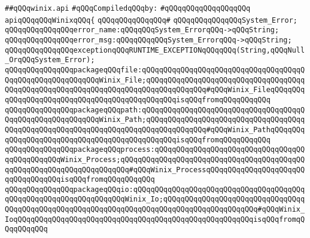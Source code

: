 \label{src/lib/src/lib/thread-kit/src/winix/winix.api}
\verb|##qQQqwinix.api|\newline
\newline
\verb|#qQQqCompiledqQQqby:|\newline
\verb|#qQQqqQQqqQQqqQQqqQQq|\newline
\newline
\newline
\newline
\verb|apiqQQqqQQqWinixqQQq{|\newline
\verb|qQQqqQQqqQQqqQQq#|\newline
\verb|qQQqqQQqqQQqqQQqSystem_Error;|\newline
\newline
\verb|qQQqqQQqqQQqqQQqerror_name:qQQqqQQqSystem_ErrorqQQq->qQQqString;|\newline
\verb|qQQqqQQqqQQqqQQqerror_msg:qQQqqQQqqQQqSystem_ErrorqQQq->qQQqString;|\newline
\newline
\verb|qQQqqQQqqQQqqQQqexceptionqQQqRUNTIME_EXCEPTIONqQQqqQQq(String,qQQqNull_OrqQQqSystem_Error);|\newline
\newline
\verb|qQQqqQQqqQQqqQQqpackageqQQqfile:qQQqqQQqqQQqqQQqqQQqqQQqqQQqqQQqqQQqqQQqqQQqqQQqqQQqqQQqqQQqWinix_File;qQQqqQQqqQQqqQQqqQQqqQQqqQQqqQQqqQQqqQQqqQQqqQQqqQQqqQQqqQQqqQQqqQQqqQQqqQQqqQQqqQQq#qQQqWinix_FileqQQqqQQqqQQqqQQqqQQqqQQqqQQqqQQqqQQqqQQqqQQqqQQqisqQQqfromqQQqqQQqqQQq|\newline
\verb|qQQqqQQqqQQqqQQqpackageqQQqpath:qQQqqQQqqQQqqQQqqQQqqQQqqQQqqQQqqQQqqQQqqQQqqQQqqQQqqQQqqQQqWinix_Path;qQQqqQQqqQQqqQQqqQQqqQQqqQQqqQQqqQQqqQQqqQQqqQQqqQQqqQQqqQQqqQQqqQQqqQQqqQQqqQQqqQQq#qQQqWinix_PathqQQqqQQqqQQqqQQqqQQqqQQqqQQqqQQqqQQqqQQqqQQqqQQqisqQQqfromqQQqqQQqqQQq|\newline
\verb|qQQqqQQqqQQqqQQqpackageqQQqprocess:qQQqqQQqqQQqqQQqqQQqqQQqqQQqqQQqqQQqqQQqqQQqqQQqWinix_Process;qQQqqQQqqQQqqQQqqQQqqQQqqQQqqQQqqQQqqQQqqQQqqQQqqQQqqQQqqQQqqQQqqQQqqQQq#qQQqWinix_ProcessqQQqqQQqqQQqqQQqqQQqqQQqqQQqqQQqqQQqisqQQqfromqQQqqQQqqQQq|\newline
\verb|qQQqqQQqqQQqqQQqpackageqQQqio:qQQqqQQqqQQqqQQqqQQqqQQqqQQqqQQqqQQqqQQqqQQqqQQqqQQqqQQqqQQqqQQqqQQqWinix_Io;qQQqqQQqqQQqqQQqqQQqqQQqqQQqqQQqqQQqqQQqqQQqqQQqqQQqqQQqqQQqqQQqqQQqqQQqqQQqqQQqqQQqqQQqqQQq#qQQqWinix_IoqQQqqQQqqQQqqQQqqQQqqQQqqQQqqQQqqQQqqQQqqQQqqQQqqQQqqQQqisqQQqfromqQQqqQQqqQQq|\newline
